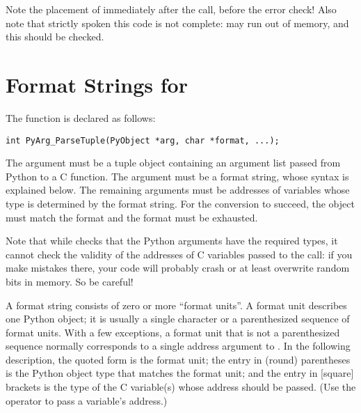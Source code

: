 \documentclass{manual}
\begin{document}
Note the placement of  immediately after the
call, before the error check!  Also note that strictly spoken this
code is not complete:  may run out of
memory, and this should be checked.


\section{Format Strings for 
         \label{parseTuple}}

The  function is declared as follows:

\begin{verbatim}
int PyArg_ParseTuple(PyObject *arg, char *format, ...);
\end{verbatim}

The  argument must be a tuple object containing an argument
list passed from Python to a C function.  The  argument
must be a format string, whose syntax is explained below.  The
remaining arguments must be addresses of variables whose type is
determined by the format string.  For the conversion to succeed, the
 object must match the format and the format must be
exhausted.

Note that while  checks that the Python
arguments have the required types, it cannot check the validity of the
addresses of C variables passed to the call: if you make mistakes
there, your code will probably crash or at least overwrite random bits
in memory.  So be careful!

A format string consists of zero or more ``format units''.  A format
unit describes one Python object; it is usually a single character or
a parenthesized sequence of format units.  With a few exceptions, a
format unit that is not a parenthesized sequence normally corresponds
to a single address argument to .  In the
following description, the quoted form is the format unit; the entry
in (round) parentheses is the Python object type that matches the
format unit; and the entry in [square] brackets is the type of the C
variable(s) whose address should be passed.  (Use the \samp{\&}
operator to pass a variable's address.)
\end{document}

